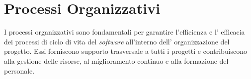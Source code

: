 \section{Processi Organizzativi}

I processi organizzativi sono fondamentali per garantire l'efficienza e l'
efficacia dei processi di ciclo di vita del \textit{software} all'interno dell'
organizzazione del progetto. Essi forniscono supporto trasversale a tutti i
progetti e contribuiscono alla gestione delle risorse, al miglioramento
continuo e alla formazione del personale.





